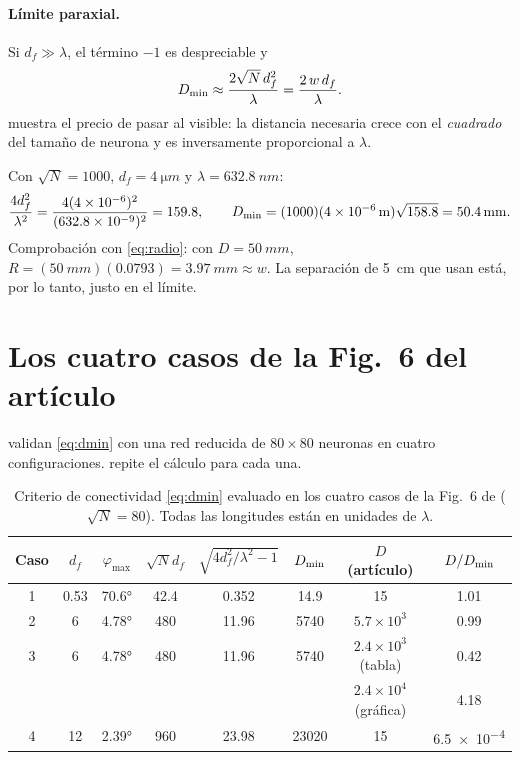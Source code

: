 \paragraph{Límite paraxial.} Si $d_f\gg\lambda$, el término $-1$ es despreciable y
\begin{equation}
  D_{\min}\approx\frac{2\sqrt N\,d_f^{2}}{\lambda}=\frac{2\,w\,d_f}{\lambda}.
  \label{eq:dmin-paraxial}
\end{equation}
 muestra el precio de pasar al visible: la distancia necesaria crece
con el \emph{cuadrado} del tamaño de neurona y es inversamente proporcional a $\lambda$.

\begin{calculo}
Con $\sqrt N=1000$, $d_f=\SI{4}{\micro m}$ y $\lambda=\SI{632.8}{nm}$:
\[
  \frac{4d_f^2}{\lambda^2}=\frac{4(\num{4e-6})^2}{(\num{632.8e-9})^2}=159.8,
  \qquad
  D_{\min}=(1000)(\SI{4e-6}{m})\sqrt{158.8}=\SI{50.4}{mm}.
\]
Comprobación con \eqref{eq:radio}: con $D=\SI{50}{mm}$, $R=(\SI{50}{mm})(0.0793)=\SI{3.97}{mm}\approx w$.
La separación de \SI{5}{cm} que usan \textcite{chen2021} está, por lo tanto, justo en el límite.
\end{calculo}

\section{Los cuatro casos de la Fig.~6 del artículo}\label{sec:casos}

\textcite{chen2021} validan \eqref{eq:dmin} con una red reducida de $80\times80$ neuronas en
cuatro configuraciones.  repite el cálculo para cada una.

\begin{table}[htb]
\centering
\caption[Criterio de conectividad en los casos de la Fig.~6]{Criterio de conectividad
\eqref{eq:dmin} evaluado en los cuatro casos de la Fig.~6 de \textcite{chen2021}
($\sqrt N=80$). Todas las longitudes están en unidades de $\lambda$.}
\label{tab:casos}
\begin{tabular}{@{}cccccccc@{}}
\toprule
Caso & $d_f$ & $\varphi_{\max}$ & $\sqrt N d_f$ & $\sqrt{4d_f^2/\lambda^2-1}$ & $D_{\min}$ & $D$ (artículo) & $D/D_{\min}$\\
\midrule
1 & 0.53 & \ang{70.6} & 42.4 & 0.352 & 14.9 & 15 & 1.01\\
2 & 6 & \ang{4.78} & 480 & 11.96 & 5740 & $5.7\times10^3$ & 0.99\\
3 & 6 & \ang{4.78} & 480 & 11.96 & 5740 & $2.4\times10^3$ (tabla) & 0.42\\
  &   &              &     &       &      & $2.4\times10^4$ (gráfica) & 4.18\\
4 & 12 & \ang{2.39} & 960 & 23.98 & \num{23020} & 15 & \num{6.5e-4}\\
\bottomrule
\end{tabular}
\end{table}

